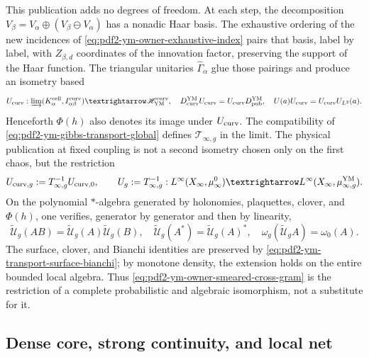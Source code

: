 This publication adds no degrees of freedom. At each step, the decomposition
$V_\beta=V_\alpha\oplus(V_\beta\ominus V_\alpha)$ has a nonadic Haar
basis. The exhaustive ordering of the new incidences of
\eqref{eq:pdf2-ym-owner-exhaustive-index} pairs that basis, label by label,
with $Z_{\beta,d}$ coordinates of the innovation factor, preserving the support of the
Haar function. The triangular unitaries $\widehat\Gamma_\alpha$ glue those
pairings and produce an isometry based
\begin{equation}\label{eq:pdf2-ym-owner-publication-into-physical}
 \mathcal U_{\rm curv}:
 \varinjlim(\mathcal K_\alpha^{\rm cell},I_{\alpha\beta}^{\rm curv})
 \longrightarrow\mathscr H_{\rm YM}^{\rm curv},
 \quad
 D_{\rm curv}^{\rm YM}\mathcal U_{\rm curv}
 =\mathcal U_{\rm curv}D_{\rm pub}^{\rm YM},
 \quad U(a)\mathcal U_{\rm curv}=\mathcal U_{\rm curv}U_{L^2}(a).
\end{equation}
Henceforth $\Phi(h)$ also denotes its image under $\mathcal U_{\rm curv}$.
The compatibility of \eqref{eq:pdf2-ym-gibbs-transport-global} defines
$\mathcal T_{\infty,g}$ in the limit. The physical publication at fixed coupling
is not a second isometry chosen only on the first chaos, but the restriction
\begin{equation}\label{eq:pdf2-ym-full-publication-restriction}
 \mathcal U_{{\rm curv},g}
 :=\mathcal T_{\infty,g}^{-1}\mathcal U_{{\rm curv},0},
 \qquad
 \widetilde{\mathcal U}_g
 :=\mathcal T_{\infty,g}^{-1}:
 L^\infty(\widehat X_\infty,\widehat\mu_\infty^0)
 \longrightarrow
 L^\infty(\widehat X_\infty,\widehat\mu_{\infty,g}^{\rm YM}).
\end{equation}
On the polynomial $*$-algebra generated by holonomies, plaquettes, clover, and
$\Phi(h)$, one verifies, generator by generator and then by linearity,
\begin{equation}\label{eq:pdf2-ym-full-publication-products}
 \widetilde{\mathcal U}_g(AB)
 =\widetilde{\mathcal U}_g(A)\widetilde{\mathcal U}_g(B),
 \quad
 \widetilde{\mathcal U}_g(A^*)=\widetilde{\mathcal U}_g(A)^*,
 \quad
 \omega_g(\widetilde{\mathcal U}_gA)=\omega_0(A).
\end{equation}
The surface, clover, and Bianchi identities are preserved by
\eqref{eq:pdf2-ym-transport-surface-bianchi}; by monotone density, the extension
holds on the entire bounded local algebra. Thus
\eqref{eq:pdf2-ym-owner-smeared-cross-gram} is the restriction of a complete
probabilistic and algebraic isomorphism, not a substitute for it.

\subsection{Dense core, strong continuity, and local net}

